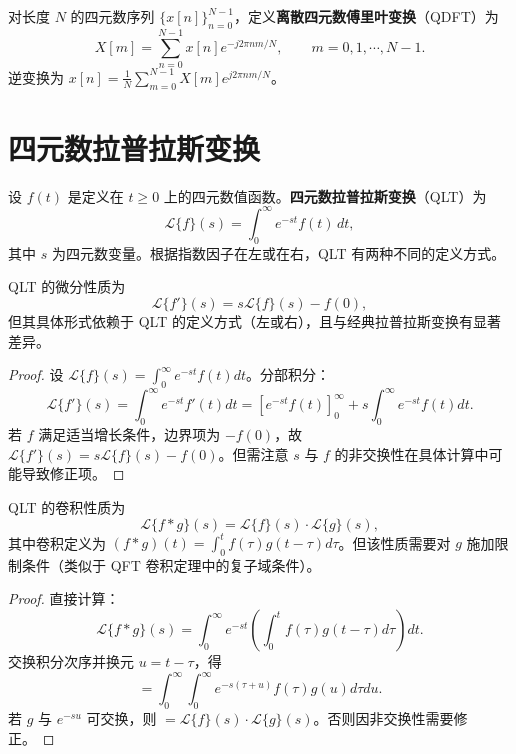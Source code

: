 \begin{definition}[离散四元数傅里叶变换]\label{def:q_dft}
对长度 $N$ 的四元数序列 $\{x[n]\}_{n=0}^{N-1}$，定义\textbf{离散四元数傅里叶变换}（QDFT）为
\[
X[m]=\sum_{n=0}^{N-1}x[n]e^{-j2\pi nm/N},\qquad m=0,1,\cdots,N-1.
\]
逆变换为 $x[n]=\frac1N\sum_{m=0}^{N-1}X[m]e^{j2\pi nm/N}$。
\end{definition}

\section{四元数拉普拉斯变换}

\begin{definition}[四元数拉普拉斯变换]\label{def:q_laplace}
设 $f(t)$ 是定义在 $t\ge 0$ 上的四元数值函数。\textbf{四元数拉普拉斯变换}（QLT）为
\[
\mathcal{L}\{f\}(s)=\int_0^\infty e^{-st}f(t)\,dt,
\]
其中 $s$ 为四元数变量。根据指数因子在左或在右，QLT 有两种不同的定义方式。
\end{definition}

\begin{theorem}\label{thm:q_laplace_derivative}
QLT 的微分性质为
\[
\mathcal{L}\{f'\}(s)=s\mathcal{L}\{f\}(s)-f(0),
\]
但其具体形式依赖于 QLT 的定义方式（左或右），且与经典拉普拉斯变换有显著差异。
\end{theorem}

\begin{proof}
设 $\mathcal{L}\{f\}(s)=\int_0^\infty e^{-st}f(t)dt$。分部积分：
\[
\mathcal{L}\{f'\}(s)=\int_0^\infty e^{-st}f'(t)dt=[e^{-st}f(t)]_0^\infty+s\int_0^\infty e^{-st}f(t)dt.
\]
若 $f$ 满足适当增长条件，边界项为 $-f(0)$，故 $\mathcal{L}\{f'\}(s)=s\mathcal{L}\{f\}(s)-f(0)$。但需注意 $s$ 与 $f$ 的非交换性在具体计算中可能导致修正项。
\end{proof}

\begin{theorem}\label{thm:q_laplace_convolution}
QLT 的卷积性质为
\[
\mathcal{L}\{f*g\}(s)=\mathcal{L}\{f\}(s)\cdot\mathcal{L}\{g\}(s),
\]
其中卷积定义为 $(f*g)(t)=\int_0^t f(\tau)g(t-\tau)d\tau$。但该性质需要对 $g$ 施加限制条件（类似于 QFT 卷积定理中的复子域条件）。
\end{theorem}

\begin{proof}
直接计算：
\[
\mathcal{L}\{f*g\}(s)=\int_0^\infty e^{-st}\left(\int_0^t f(\tau)g(t-\tau)d\tau\right)dt.
\]
交换积分次序并换元 $u=t-\tau$，得
\[
=\int_0^\infty\int_0^\infty e^{-s(\tau+u)}f(\tau)g(u)d\tau du.
\]
若 $g$ 与 $e^{-su}$ 可交换，则 $=\mathcal{L}\{f\}(s)\cdot\mathcal{L}\{g\}(s)$。否则因非交换性需要修正。
\end{proof}

